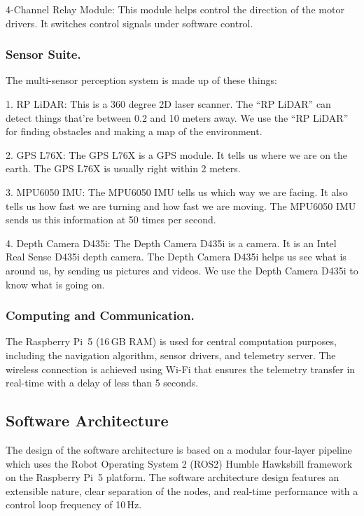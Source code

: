 \documentclass[runningheads]{llncs}
\begin{document}
4-Channel Relay Module: This module helps control the direction of the motor drivers. It switches control signals under software control.

 


\subsubsection{Sensor Suite.}

The multi-sensor perception system is made up of these things:

1. RP LiDAR: This is a 360 degree 2D laser scanner. The ``RP LiDAR'' can detect things that're between 0.2 and 10 meters away. We use the ``RP LiDAR'' for finding obstacles and making a map of the environment.

2. GPS L76X: The  GPS L76X  is a GPS module. It tells us where we are on the earth. The GPS L76X is usually right within 2 meters.

3. MPU6050 IMU: The MPU6050 IMU tells us which way we are facing. It also tells us how fast we are turning and how fast we are moving. The  MPU6050 IMU  sends us this information at 50 times per second.

4. Depth Camera D435i: The  Depth Camera D435i is a camera. It is an Intel Real Sense D435i depth camera. The  Depth Camera D435i  helps us see what is around us, by sending us pictures and videos. We use the  Depth Camera D435i  to know what is going on.

 

\subsubsection{Computing and Communication.}

The Raspberry Pi~5 (16\,GB RAM) is used for central computation purposes, including the navigation algorithm, sensor drivers, and telemetry server. The wireless connection is achieved using Wi-Fi that ensures the telemetry transfer in real-time with a delay of less than 5 seconds.

\subsection{Software Architecture}

The design of the software architecture is based on a modular four-layer pipeline which uses the Robot Operating System 2 (ROS2) Humble Hawksbill framework on the Raspberry Pi~5 platform. The software architecture design features an extensible nature, clear separation of the nodes, and real-time performance with a control loop frequency of 10\,Hz.
\end{document}
